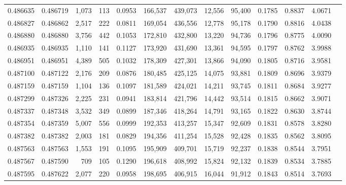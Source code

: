 \begin{tabular}{rrrrrrrrrrrrr}
0.486635 & 0.486719 & 1,073 &   113 &                                     0.0953 & 166,537 & 439,073 &  12,556 &  95,400 & 0.1785 & 0.8837 & 4.0671 \\
0.486827 & 0.486862 & 2,517 &   222 &                                     0.0811 & 169,054 & 436,556 &  12,778 &  95,178 & 0.1790 & 0.8816 & 4.0438 \\
0.486880 & 0.486880 & 3,756 &   442 &                                     0.1053 & 172,810 & 432,800 &  13,220 &  94,736 & 0.1796 & 0.8775 & 4.0090 \\
0.486935 & 0.486935 & 1,110 &   141 &                                     0.1127 & 173,920 & 431,690 &  13,361 &  94,595 & 0.1797 & 0.8762 & 3.9988 \\
0.486951 & 0.486951 & 4,389 &   505 &                                     0.1032 & 178,309 & 427,301 &  13,866 &  94,090 & 0.1805 & 0.8716 & 3.9581 \\
0.487100 & 0.487122 & 2,176 &   209 &                                     0.0876 & 180,485 & 425,125 &  14,075 &  93,881 & 0.1809 & 0.8696 & 3.9379 \\
0.487159 & 0.487159 & 1,104 &   136 &                                     0.1097 & 181,589 & 424,021 &  14,211 &  93,745 & 0.1811 & 0.8684 & 3.9277 \\
0.487299 & 0.487326 & 2,225 &   231 &                                     0.0941 & 183,814 & 421,796 &  14,442 &  93,514 & 0.1815 & 0.8662 & 3.9071 \\
0.487337 & 0.487348 & 3,532 &   349 &                                     0.0899 & 187,346 & 418,264 &  14,791 &  93,165 & 0.1822 & 0.8630 & 3.8744 \\
0.487354 & 0.487359 & 5,007 &   556 &                                     0.0999 & 192,353 & 413,257 &  15,347 &  92,609 & 0.1831 & 0.8578 & 3.8280 \\
0.487382 & 0.487382 & 2,003 &   181 &                                     0.0829 & 194,356 & 411,254 &  15,528 &  92,428 & 0.1835 & 0.8562 & 3.8095 \\
0.487563 & 0.487563 & 1,553 &   191 &                                     0.1095 & 195,909 & 409,701 &  15,719 &  92,237 & 0.1838 & 0.8544 & 3.7951 \\
0.487567 & 0.487590 &   709 &   105 &                                     0.1290 & 196,618 & 408,992 &  15,824 &  92,132 & 0.1839 & 0.8534 & 3.7885 \\
0.487595 & 0.487622 & 2,077 &   220 &                                     0.0958 & 198,695 & 406,915 &  16,044 &  91,912 & 0.1843 & 0.8514 & 3.7693 \\

\end{tabular}

